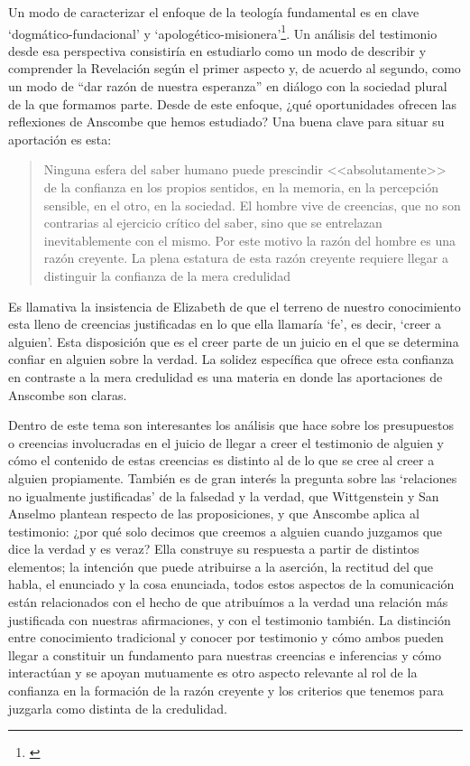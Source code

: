 Un modo de caracterizar el enfoque de la teología fundamental es en clave `dogmático-fundacional' y `apologético-misionera'\footnote{\Cite[Cf.][80-85]{ninot2009tf}}. Un análisis del testimonio desde esa perspectiva consistiría en estudiarlo como un modo de describir y comprender la Revelación según el primer aspecto y, de acuerdo al segundo, como un modo de ``dar razón de nuestra esperanza'' en diálogo con la sociedad plural de la que formamos parte. Desde de este enfoque, ¿qué oportunidades ofrecen las reflexiones de Anscombe que hemos estudiado? Una buena clave para situar su aportación es esta: \blockquote[{\Cite[451]{prades2015testimonio}}]{Ninguna esfera del saber humano puede prescindir <<absolutamente>> de la confianza en los propios sentidos, en la memoria, en la percepción sensible, en el otro, en la sociedad. El hombre vive de creencias, que no son contrarias al ejercicio crítico del saber, sino que se entrelazan inevitablemente con el mismo. Por este motivo la razón del hombre es una razón creyente. La plena estatura de esta razón creyente requiere llegar a distinguir la confianza de la mera credulidad}. Es llamativa la insistencia de Elizabeth de que el terreno de nuestro conocimiento esta lleno de creencias justificadas en lo que ella llamaría `fe', es decir, `creer a alguien'. Esta disposición que es el creer parte de un juicio en el que se determina confiar en alguien sobre la verdad. La solidez específica que ofrece esta confianza en contraste a la mera credulidad es una materia en donde las aportaciones de Anscombe son claras.

Dentro de este tema son interesantes los análisis que hace sobre los presupuestos o creencias involucradas en el juicio de llegar a creer el testimonio de alguien y cómo el contenido de estas creencias es distinto al de lo que se cree al creer a alguien propiamente. También es de gran interés la pregunta sobre las `relaciones no igualmente justificadas' de la falsedad y la verdad, que Wittgenstein y San Anselmo plantean respecto de las proposiciones, y que Anscombe aplica al testimonio: ¿por qué solo decimos que creemos a alguien cuando juzgamos que dice la verdad y es veraz? Ella construye su respuesta a partir de distintos elementos; la intención que puede atribuirse a la aserción, la rectitud del que habla, el enunciado y la cosa enunciada, todos estos aspectos de la comunicación están relacionados con el hecho de que atribuímos a la verdad una relación más justificada con nuestras afirmaciones, y con el testimonio también. La distinción entre conocimiento tradicional y conocer por testimonio y cómo ambos pueden llegar a constituir un fundamento para nuestras creencias e inferencias y cómo interactúan y se apoyan mutuamente es otro aspecto relevante al rol de la confianza en la formación de la razón creyente y los criterios que tenemos para juzgarla como distinta de la credulidad.

